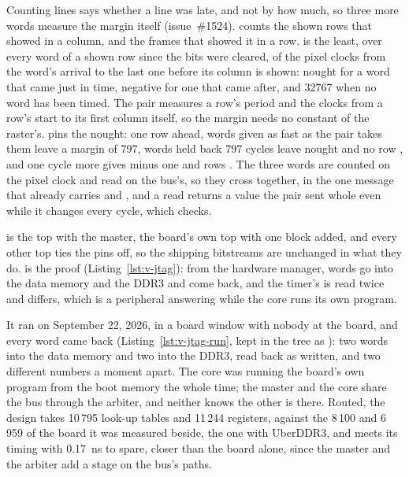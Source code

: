 \documentclass[journal,onecolumn,9pt]{IEEEtran}
\begin{document}
Counting lines says whether a line was late, and not by how much, so
three more words measure the margin itself (issue~\#1524).
 counts the shown rows that showed  in a
column, and  the frames that showed it in a row.
 is the least, over every word of a shown row since the
bits were cleared, of the pixel clocks from the word's arrival to the
last one before its column is shown: nought for a word that came just
in time, negative for one that came after, and 32767 when no word has
been timed. The pair measures a row's period and the clocks from a
row's start to its first column itself, so the margin needs no
constant of the raster's.
pins the nought: one row ahead, words given as fast as the pair takes
them leave a margin of 797, words held back 797 cycles leave nought
and no row , and one cycle more gives minus one and rows
. The three words are counted on the pixel clock and read
on the bus's, so they cross together, in the one message that already
carries  and , and a read returns a value the
pair sent whole even while it changes every cycle, which
 checks.

 is the top with the master, the board's
own top with one block added, and every other top ties the pins off,
so the shipping bitstreams are unchanged in what they do.
 is the proof
(Listing~\ref{lst:v-jtag}): from the hardware manager, words go into
the data memory and the DDR3 and come back, and the timer's
 is read twice and differs, which is a peripheral
answering while the core runs its own program.



It ran on September 22, 2026, in a board window with nobody at the
board, and every word came back (Listing~\ref{lst:v-jtag-run}, kept
in the tree as ): two words into the data
memory and two into the DDR3, read back as written, and 
two different numbers a moment apart. The core was running the
board's own program from the boot memory the whole time; the master
and the core share the bus through the arbiter, and neither knows
the other is there. Routed, the design takes 10\,795 look-up tables and 11\,244
registers, against the 8\,100 and 6\,959 of the board it was measured
beside, the one with UberDDR3, and meets its
timing with 0.17~ns to spare, closer than the board alone, since the
master and the arbiter add a stage on the bus's paths.
\end{document}
